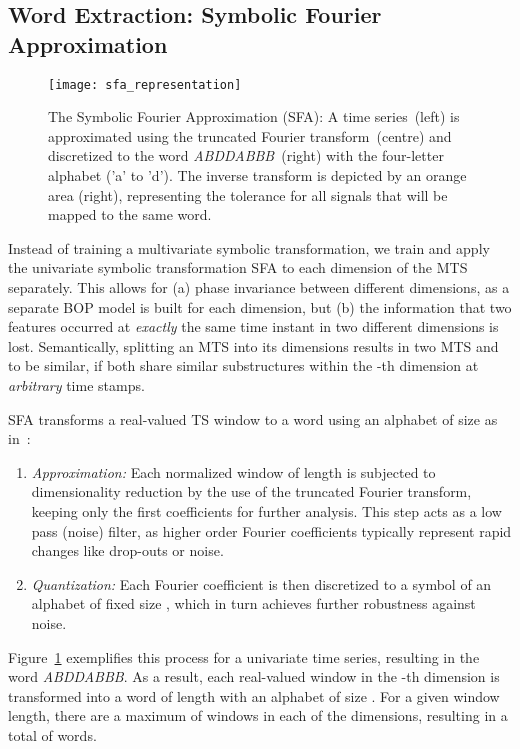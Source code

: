 \documentclass[sigconf]{acmart}
\begin{document}
\subsection{Word Extraction: Symbolic Fourier Approximation}\label{subsec:SymbolicRepresentation}

\begin{figure}
	\begin{centering}
		\texttt{[image: sfa\_representation]}
	\end{centering}
	\caption{The Symbolic Fourier Approximation (SFA): A time series~(left) is approximated using the truncated Fourier transform~(centre) and discretized to the word \emph{ABDDABBB}~(right) with the four-letter alphabet ('a' to 'd'). The inverse transform is depicted by an orange area (right), representing the tolerance for all signals that will be mapped to the same word.\label{fig:SFATransform}}
\end{figure}

Instead of training a multivariate symbolic transformation, we train and apply the univariate symbolic transformation SFA to each dimension of the MTS separately. This allows for (a) phase invariance between different dimensions, as a separate BOP model is built for each dimension, but (b) the information that two features occurred at \emph{exactly} the same time instant in two different dimensions is lost.
Semantically, splitting an MTS into its dimensions results in two MTS  and  to be similar, if both share similar substructures within the -th dimension at \emph{arbitrary} time stamps. 

SFA transforms a real-valued TS window to a word using an alphabet of size  as in~\cite{SchaferH12}: 
 
 \begin{enumerate}
	\item \emph{Approximation:} Each normalized window of length  is subjected to dimensionality reduction by the use of the truncated Fourier transform, keeping only the first  coefficients for further analysis. This step acts as a low pass (noise) filter, as higher order Fourier coefficients typically represent rapid changes like drop-outs or noise.
 	\item \emph{Quantization:} Each Fourier coefficient is then discretized to a symbol of an alphabet of fixed size , which in turn achieves further robustness against noise.
 \end{enumerate}
 
Figure~\ref{fig:SFATransform} exemplifies this process for a univariate time series, resulting in the word \emph{ABDDABBB}. 
As a result, each real-valued window in the -th dimension is transformed into a word of length  with an alphabet of size . For a given window length, there are a maximum of  windows in each of the  dimensions, resulting in a total of  words.
  
\end{document}
